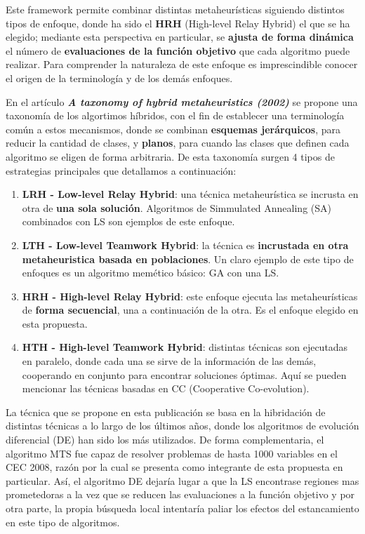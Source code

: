 Este framework permite combinar distintas metaheurísticas siguiendo distintos tipos de enfoque, donde ha sido el \textbf{HRH} (High-level Relay Hybrid) el que se ha elegido; mediante esta perspectiva en particular, se \textbf{ajusta de forma dinámica} el número de \textbf{evaluaciones de la función objetivo} que cada algoritmo puede realizar. Para comprender la naturaleza de este enfoque es imprescindible conocer el origen de la terminología y de los demás enfoques.

En el artículo \textbf{\textit{A taxonomy of hybrid metaheuristics (2002)}	}\cite{TaxonomyEAs} se propone una taxonomía de los algortimos híbridos, con el fin de establecer una terminología común a estos mecanismos, donde se combinan \textbf{esquemas jerárquicos}, para reducir la cantidad de clases, y \textbf{planos}, para cuando las clases que definen cada algoritmo se eligen de forma arbitraria. De esta taxonomía surgen 4 tipos de estrategias principales que detallamos a continuación:

\begin{enumerate}
	\item \textbf{LRH - Low-level Relay Hybrid}: una técnica metaheurística se incrusta en otra de \textbf{una sola solución}. Algoritmos de Simmulated Annealing (SA) combinados con LS son ejemplos de este enfoque.
	
	\item \textbf{LTH - Low-level Teamwork Hybrid}: la técnica es \textbf{incrustada en otra metaheuristica basada en poblaciones}. Un claro ejemplo de este tipo de enfoques es un algoritmo memético básico: GA con una LS.
	
	\item \textbf{HRH - High-level Relay Hybrid}: este enfoque ejecuta las metaheurísticas de \textbf{forma secuencial}, una a continuación de la otra. Es el enfoque elegido en esta propuesta.
	
	\item \textbf{HTH - High-level Teamwork Hybrid}: distintas técnicas son ejecutadas en paralelo, donde cada una se sirve de la información de las demás, cooperando en conjunto para encontrar soluciones óptimas. Aquí se pueden mencionar las técnicas basadas en CC (Cooperative Co-evolution).
\end{enumerate}

La técnica que se propone en esta publicación se basa en la hibridación de distintas técnicas a lo largo de los últimos años, donde los algoritmos de evolución diferencial (DE) han sido los más utilizados. De forma complementaria, el algoritmo MTS\cite{MTS-LSGO} fue capaz de resolver problemas de hasta 1000 variables en el CEC 2008, razón por la cual se presenta como integrante de esta propuesta en particular. Así, el algoritmo DE dejaría lugar a que la LS encontrase regiones mas prometedoras a la vez que se reducen las evaluaciones a la función objetivo y por otra parte, la propia búsqueda local intentaría paliar los efectos del estancamiento en este tipo de algoritmos.

